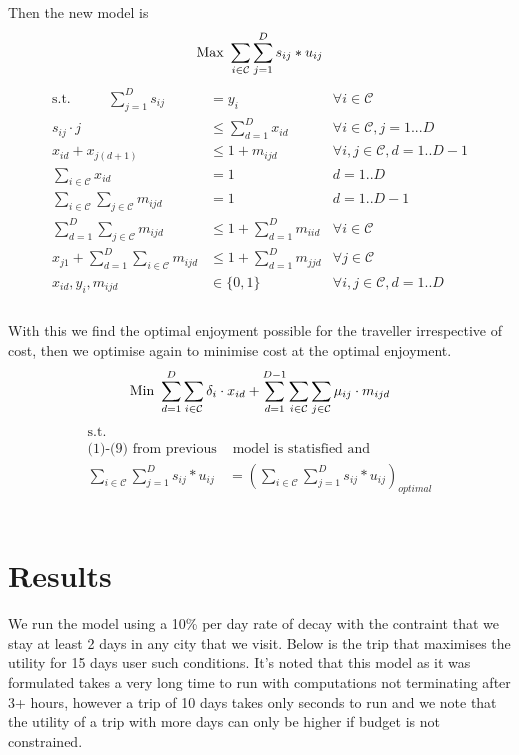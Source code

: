 \documentclass[a4paper]{article}
\begin{document}
Then the new model is 
\begin{equation*}
\text{Max } \sum_{i \in \mathcal{C}} \sum_{j=1}^{D} s_{ij} * u_{ij}\\
\end{equation*}
\begin{align}
\text{s.t.~~~~~~~~}
\sum_{j=1}^{D} s_{ij} &= y_{i} & \forall i \in \mathcal{C}\\
s_{ij} \cdot j &\leq \sum_{d=1}^{D} x_{id} & \forall i \in \mathcal{C}, j=1...D\\
x_{id} + x_{j(d+1)} & \leq 1 + m_{ijd} & \forall i,j \in \mathcal{C}, d = 1..D-1 \\
\sum_{i \in \mathcal{C}} x_{id} &= 1 & d = 1..D \\
\sum_{i \in \mathcal{C}} \sum_{j \in \mathcal{C}} m_{ijd} &= 1 & d = 1..D-1 \\
\sum_{d=1}^{D} \sum_{j \in \mathcal{C}} m_{ijd} &\leq 1 + \sum_{d=1}^{D} m_{iid} & \forall i \in \mathcal{C} \\
x_{j1} + \sum_{d=1}^{D} \sum_{i \in \mathcal{C}} m_{ijd} &\leq 1 + \sum_{d=1}^{D} m_{jjd} & \forall j \in \mathcal{C}\\
x_{id}, y_{i}, m_{ijd} & \in \{0,1\} & \forall i, j \in \mathcal{C}, d = 1..D\\
\end{align}\\
With this we find the optimal enjoyment possible for the traveller irrespective of cost, then we optimise again to minimise cost at the optimal enjoyment.
\begin{equation*}
\text{Min } \sum_{d=1}^{D} \sum_{i \in \mathcal{C}} \delta_{i} \cdot x_{id} + \sum_{d=1}^{D-1} \sum_{i \in \mathcal{C}} \sum_{j \in \mathcal{C}} \mu_{ij} \cdot m_{ijd}\\
\end{equation*}
\begin{align*}
\text{s.t.~~~~~~~~} & \\
\text{(1)-(9) from previous} &\text{ model is statisfied and} \\
\sum_{i \in \mathcal{C}} \sum_{j=1}^{D} s_{ij} * u_{ij} &= (\sum_{i \in \mathcal{C}} \sum_{j=1}^{D} s_{ij} * u_{ij})_{optimal}
\end{align*}\\

\newpage
\section{Results}
We run the model using a 10\% per day rate of decay with the contraint that we stay at least 2 days in any city that we visit. Below is the trip that maximises the utility for 15 days user such conditions. It's noted that this model as it was formulated takes a very long time to run with computations not terminating after 3+ hours, however a trip of 10 days takes only seconds to run and we note that the utility of a trip with more days can only be higher if budget is not constrained. 
\end{document}
